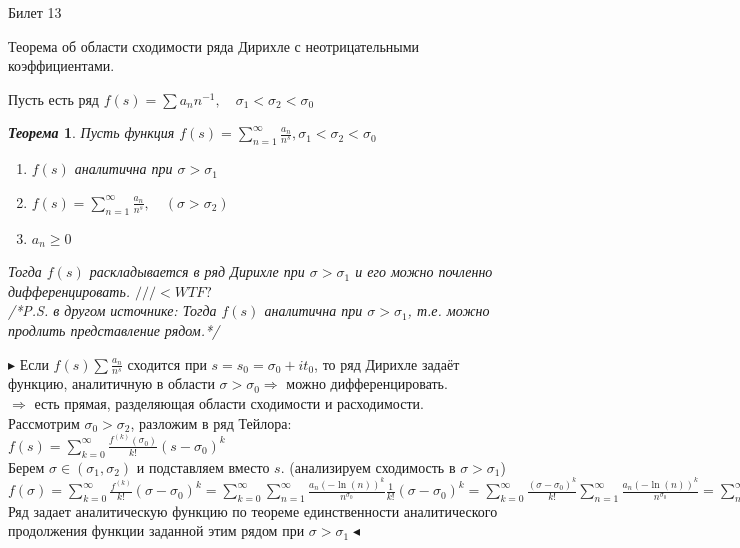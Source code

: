 \documentclass[a4paper,12pt]{article}
\newtheorem{teo}{\textit{Теорема}}
\newcommand{\q}{\quad}
\newcommand{\pb}{\blacktriangleright}
\newcommand{\pe}{\blacktriangleleft}
\newcommand{\Ra}{\Rightarrow}
\newcommand{\SL}{\sum\limits}
\newcommand{\os}{\left(}
\newcommand{\cs}{\right)}
\begin{document}
\newpage
\begin{mybox}{\hypertarget{bil13}{Билет 13}}

\begin{formbox}{}
Теорема об области сходимости ряда Дирихле с неотрицательными коэффициентами.
\end{formbox}
Пусть есть  ряд $f(s) = \sum a_n n^{-1}, \q \sigma_1 < \sigma_2 < \sigma_0$\\

\begin{formbox}{}
\begin{teo} Пусть функция $f(s) = \SL_{n=1}^\infty \frac{a_n}{n^s}, \sigma_1 <\sigma_2 < \sigma_0 $
\begin{enumerate}
\item $f(s)$ аналитична при $\sigma > \sigma_1$
\item $f(s) = \SL_{n=1}^\infty  \frac{a_n}{n^s},\q(\sigma > \sigma_2) $
\item $a_n \ge 0$
\end{enumerate}
Тогда $f(s)$ раскладывается в ряд Дирихле при $\sigma > \sigma_1$ и его можно почленно дифференцировать. $///<WTF?$\\
/*P.S. в другом источнике: Тогда $f(s)$ аналитична при $\sigma > \sigma_1$, т.е. можно продлить представление рядом.*/
\end{teo}
\end{formbox}
$\pb $ Если $f(s) \sum \frac{a_n}{n^s}$ сходится при $s = s_0 = \sigma_0 + it_0$, то ряд Дирихле задаёт функцию, аналитичную в области $\sigma > \sigma_0\Ra$ можно дифференцировать.\\
$\Ra$ есть прямая, разделяющая области сходимости и расходимости.\\
Рассмотрим $\sigma_0 > \sigma_2$,  разложим в ряд Тейлора:\\
$f(s) = \SL_{k=0}^\infty \frac{f^{(k)}(\sigma_0)}{k!} (s - \sigma_0)^k $\\
Берем $\sigma\in(\sigma_1, \sigma_2)$ и подставляем вместо $s$. (анализируем сходимость в $\sigma > \sigma_1$)\\
$f(\sigma) = \SL_{k=0}^\infty \frac{f^{(k)}}{k!}(\sigma - \sigma_0)^k = \SL_{k=0}^\infty \SL_{n=1}^\infty \frac{a_n (-\ln(n))^k}{n^{\sigma_0}} \frac{1}{k!} (\sigma - \sigma_0)^k   = \SL_{k=0}^\infty \frac{(\sigma - \sigma_0)^k}{k!}\SL_{n=1}^\infty \frac{a_n (-\ln(n))^k}{n^{\sigma_0}} = \SL_{n=1}^\infty \frac{a_n}{n^{\sigma_0}} \SL_{k=0}^\infty \frac{\os(\sigma_0 - \sigma)\ln(n)\cs^k}{k!}  = \SL_{n=1}^\infty \frac{a_n}{n^{\sigma_0}} e^{(\sigma - \sigma_0)\ln(n)} = \SL_{n=1}^\infty \frac{a_n}{n^\sigma} $\\
Ряд задает аналитическую функцию по теореме единственности аналитического продолжения функции заданной этим рядом при $\sigma > \sigma_1 \pe$
\end{mybox}
\end{document}

